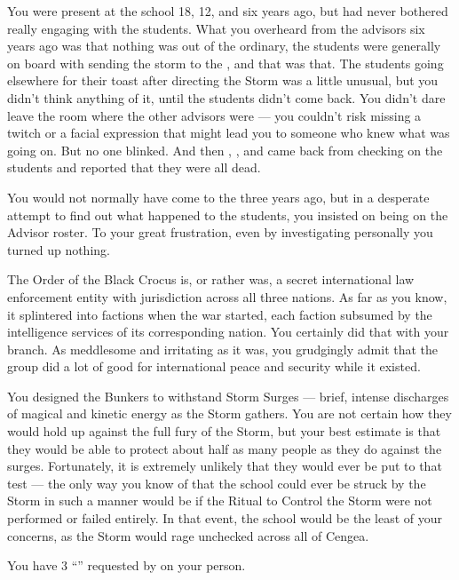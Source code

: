 \documentclass[char]{GL2020}
\begin{document}
\begin{itemz}[Notes]
    \item You were present at the school 18, 12, and six years ago, but had never bothered really engaging with the students. What you overheard from the advisors six years ago was that nothing was out of the ordinary, the students were generally on board with sending the storm to the \pTech{}, and that was that. The students going elsewhere for their toast after directing the Storm was a little unusual, but you didn't think anything of it, until the students didn't come back. You didn't dare leave the room where the other advisors were — you couldn't risk missing a twitch or a facial expression that might lead you to someone who knew what was going on. But no one blinked. And then \cPrincipal{}, \cDiplomat{\full}, and \cMusic{\full} came back from checking on the students and reported that they were all dead.
    \item You would not normally have come to the \pSc{} three years ago, but in a desperate attempt to find out what happened to the students, you insisted on being on the Advisor roster. To your great frustration, even by investigating personally you turned up nothing.
    \item The Order of the Black Crocus is, or rather was, a secret international law enforcement entity with jurisdiction across all three nations. As far as you know, it splintered into factions when the war started, each faction subsumed by the intelligence services of its corresponding nation. You certainly did that with your branch. As meddlesome and irritating as it was, you grudgingly admit that the group did a lot of good for international peace and security while it existed.
    \item You designed the Bunkers to withstand Storm Surges — brief, intense discharges of magical and kinetic energy as the Storm gathers. You are not certain how they would hold up against the full fury of the Storm, but your best estimate is that they would be able to protect about half as many people as they do against the surges. Fortunately, it is extremely unlikely that they would ever be put to that test — the only way you know of that the school could ever be struck by the Storm in such a manner would be if the Ritual to Control the Storm were not performed or failed entirely. In that event, the school would be the least of your concerns, as the Storm would rage unchecked across all of Cengea.
    \item You have 3 ``\iMagitechParts{}'' requested by \cTechStar{} on your person. 
\end{itemz}
\end{document}
